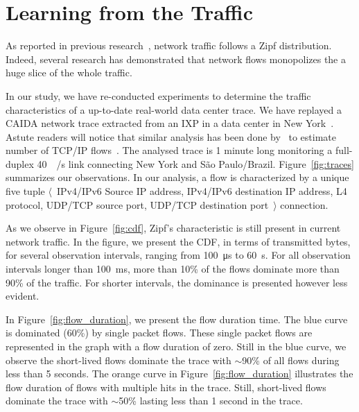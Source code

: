 
\section{Learning from the Traffic}\label{sec:traffic}

As reported in previous research~\cite{Sarrar:2012}, network traffic follows a Zipf distribution.
Indeed, several research has demonstrated that network flows monopolizes the a huge slice of the whole traffic.

In our study, we have re-conducted experiments to determine the traffic characteristics of a up-to-date real-world data center trace.
We have replayed a CAIDA network trace extracted from an IXP in a data center in New York~\cite{caida:19}.
Astute readers will notice that similar analysis has been done by~\citeauthor{Spang:19} to estimate number of TCP/IP flows~\cite{Spang:19}.
The analysed trace is 1 minute long monitoring a full-duplex \SI{40}{\giga\bit/\second} link connecting New York and S\~ao Paulo/Brazil.
Figure~\ref{fig:traces} summarizes our observations. In our analysis, a flow is characterized by a unique five tuple $\langle$~IPv4/IPv6 Source IP address, IPv4/IPv6 destination IP address, L4 protocol, UDP/TCP source port, UDP/TCP destination port~$\rangle$ connection.

As we observe in Figure~\ref{fig:cdf}, Zipf's characteristic is still present in current network traffic.
In the figure, we present the CDF, in terms of transmitted bytes, for several observation intervals, ranging from \SI{100}{\micro\second} to \SI{60}{\second}.
For all observation intervals longer than \SI{100}{\milli\second}, more than 10\% of the flows dominate more than 90\% of the traffic.
For shorter intervals, the dominance is presented however less evident.

In Figure~\ref{fig:flow_duration}, we present the flow duration time.
The blue curve is dominated (60\%) by single packet flows.
These single packet flows are represented in the graph with a flow duration of zero.
Still in the blue curve, we observe the short-lived flows dominate the trace with $\sim$90\% of all flows during less than 5 seconds.
The orange curve in Figure~\ref{fig:flow_duration} illustrates the flow duration of flows with multiple hits in the trace.
Still, short-lived flows dominate the trace with $\sim$50\% lasting less than 1 second in the trace.

